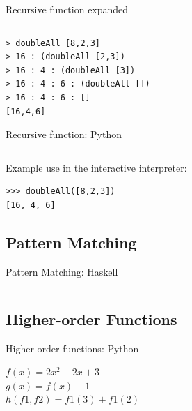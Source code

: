 \documentclass[mathserif]{beamer}
\begin{document}
\begin{frame}[fragile]{Recursive function expanded}

  \inputminted[fontsize=\Large,lastline=3]{haskell}{code/haskell/doubleall_recursion.hs}

  \vskip5mm

  \begin{verbatim}
> doubleAll [8,2,3]
> 16 : (doubleAll [2,3])
> 16 : 4 : (doubleAll [3])
> 16 : 4 : 6 : (doubleAll [])
> 16 : 4 : 6 : []
[16,4,6]
  \end{verbatim}

\end{frame}

\begin{frame}[fragile]{Recursive function: Python}

  \inputminted[fontsize=\large,firstline=3,lastline=9]{python}{code/python/doubleall_recursion.py}

  \vskip5mm

Example use in the interactive interpreter:

  \begin{verbatim}
>>> doubleAll([8,2,3])
[16, 4, 6]
  \end{verbatim}

\end{frame}

\subsection{Pattern Matching}

\begin{frame}{Pattern Matching: Haskell}

  \inputminted[fontsize=\Large,lastline=3]{haskell}{code/haskell/doubleall_recursion.hs}

\end{frame}

\subsection{Higher-order Functions}

\begin{frame}{Higher-order functions: Python}

  {\large $f(x) = 2x^2 - 2x + 3$}\\
  {\large $g(x) = f(x) + 1$}\\
  {\large $h(f1, f2) = f1(3) + f1(2)$}\\

  \vskip5mm

  \inputminted[firstline=3,lastline=10]{python}{code/python/higher_order.py}

\end{frame}
\end{document}
